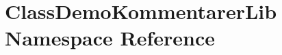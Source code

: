 \hypertarget{namespace_class_demo_kommentarer_lib}{}\section{Class\+Demo\+Kommentarer\+Lib Namespace Reference}
\label{namespace_class_demo_kommentarer_lib}
